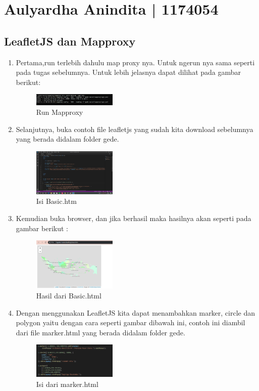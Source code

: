 \section{Aulyardha Anindita | 1174054}
\subsection{LeafletJS dan Mapproxy}
\begin{enumerate}
\item Pertama,run terlebih dahulu map proxy nya. Untuk ngerun nya sama seperti pada tugas sebelumnya. Untuk lebih jelasnya dapat dilihat pada gambar berikut:
\hfill\break
\begin{figure}[H]
\includegraphics[width=4cm]{figures/tugas5/1174054/1.png}
\centering
\caption{Run Mapproxy}
\end{figure}
    
\item Selanjutnya, buka contoh file leafletjs yang sudah kita download sebelumnya yang berada didalam folder gede. 
\hfill\break
\begin{figure}[H]
\includegraphics[width=4cm]{figures/tugas5/1174054/2.png}
\centering
\caption{Isi Basic.htm}
\end{figure}
    
\item Kemudian buka browser, dan jika berhasil maka hasilnya akan seperti pada gambar berikut :
\hfill\break
\begin{figure}[H]
\includegraphics[width=4cm]{figures/tugas5/1174054/3.png}
\centering
\caption{Hasil dari Basic.html}
\end{figure}
  
\item Dengan menggunakan LeafletJS kita dapat menambahkan marker, circle dan polygon yaitu dengan cara seperti gambar dibawah ini, contoh ini diambil dari file marker.html yang berada didalam folder gede.
\hfill\break
\begin{figure}[H]
\includegraphics[width=4cm]{figures/tugas5/1174054/4.png}
\centering
\caption{Isi dari marker.html}
\end{figure}
  

\end{enumerate}
